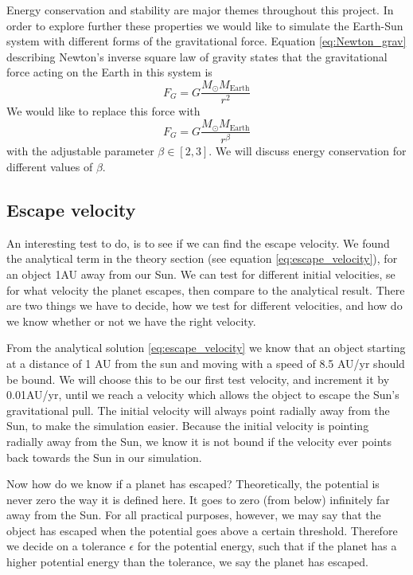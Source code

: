 \documentclass[reprint, english,notitlepage,nofootinbib]{revtex4-1}  %
\begin{document}
Energy conservation and stability are major themes throughout this project. In order to explore further these properties we would like to simulate the Earth-Sun system with different forms of the gravitational force. Equation \eqref{eq:Newton_grav} describing Newton's inverse square law of gravity states that the gravitational force acting on the Earth in this system is
\begin{equation*}
  F_G = G \frac{M_\odot M_{\text{Earth}}}{r^2}
\end{equation*}
We would like to replace this force with
\begin{equation}
  F_G = G \frac{M_\odot M_{\text{Earth}}}{r^\beta}
  \label{eq:Newton_grav_beta}
\end{equation}
with the adjustable parameter $\beta \in [2, 3]$. We will discuss energy conservation for different values of $\beta$.


\subsection{Escape velocity}

An interesting test to do, is to see if we can find the escape velocity. We found the analytical term in the theory section (see equation \eqref{eq:escape_velocity}), for an object 1AU away from our Sun. We can test for different initial velocities, se for what velocity the planet escapes, then compare to the analytical result. There are two things we have to decide, how we test for different velocities, and how do we know whether or not we have the right velocity.

From the analytical solution \eqref{eq:escape_velocity} we know that an object starting at a distance of 1 AU from the sun and moving with a speed of 8.5 AU/yr should be bound. We will choose this to be our first test velocity, and increment it by 0.01AU/yr, until we reach a velocity which allows the object to escape the Sun's gravitational pull. The initial velocity will always point radially away from the Sun, to make the simulation easier. Because the initial velocity is pointing radially away from the Sun, we know it is not bound if the velocity ever points back towards the Sun in our simulation.

Now how do we know if a planet has escaped? Theoretically, the potential is never zero the way it is defined here. It goes to zero (from below) infinitely far away from the Sun. For all practical purposes, however, we may say that the object has escaped when the potential goes above a certain threshold. Therefore we decide on a tolerance $\epsilon$ for the potential energy, such that if the planet has a higher potential energy than the tolerance, we say the planet has escaped.
\end{document}

